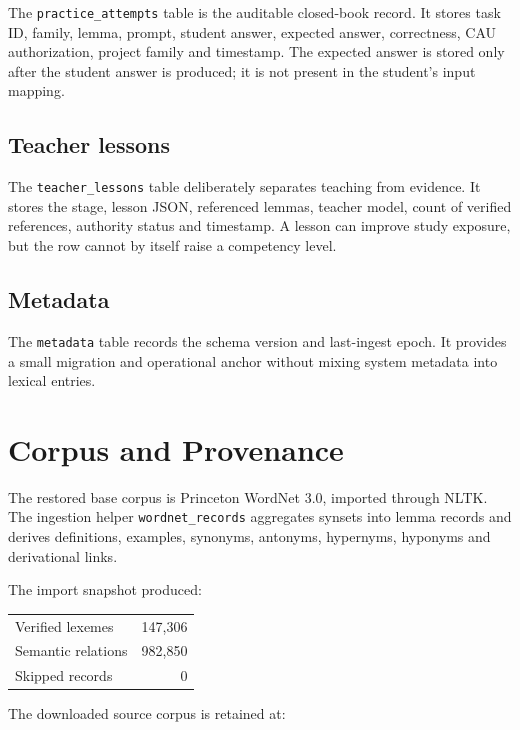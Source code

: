 \documentclass[11pt,a4paper]{article}
\begin{document}
The \texttt{practice\_attempts} table is the auditable closed-book record. It stores task ID,
family, lemma, prompt, student answer, expected answer, correctness, CAU authorization,
project family and timestamp. The expected answer is stored only after the student answer is
produced; it is not present in the student's input mapping.

\subsection{Teacher lessons}

The \texttt{teacher\_lessons} table deliberately separates teaching from evidence. It stores
the stage, lesson JSON, referenced lemmas, teacher model, count of verified references,
authority status and timestamp. A lesson can improve study exposure, but the row cannot by
itself raise a competency level.

\subsection{Metadata}

The \texttt{metadata} table records the schema version and last-ingest epoch. It provides a
small migration and operational anchor without mixing system metadata into lexical entries.

\section{Corpus and Provenance}

The restored base corpus is Princeton WordNet 3.0, imported through NLTK. The ingestion helper
\texttt{wordnet\_records} aggregates synsets into lemma records and derives definitions,
examples, synonyms, antonyms, hypernyms, hyponyms and derivational links.

The import snapshot produced:

\begin{center}
\begin{tabular}{lr}
\toprule
Verified lexemes & 147,306 \\
Semantic relations & 982,850 \\
Skipped records & 0 \\
\bottomrule
\end{tabular}
\end{center}

The downloaded source corpus is retained at:

\begin{quote}
\end{quote}
\end{document}
